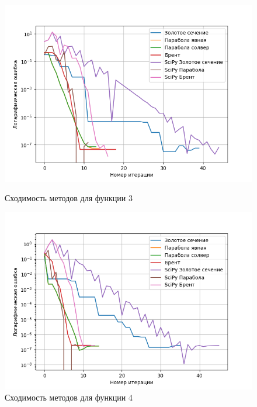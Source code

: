 \documentclass[a4paper,12pt]{article}
\begin{document}
\begin{figure}[H]
    \begin{minipage}{0.49\textwidth}
        \centering \includegraphics[width=\textwidth]{images/task1/f3_with_scipy.png}
        \caption{Сходимость методов для функции 3}
    \end{minipage}\hfill
    \begin{minipage}{0.49\textwidth}
        \centering \includegraphics[width=\textwidth]{images/task1/f4_with_scipy.png}
        \caption{Сходимость методов для функции 4}
    \end{minipage}
\end{figure}
\end{document}
